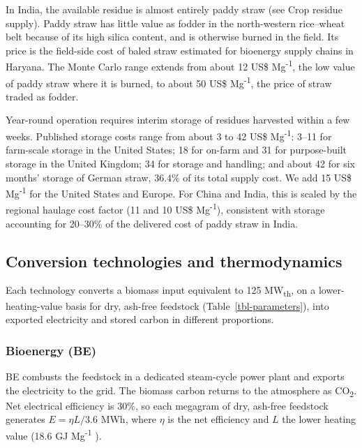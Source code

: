 \documentclass[
  letterpaper,
  twoside,
  twocolumn,
  9pt]{article}
\begin{document}
In India, the available residue is almost entirely paddy straw (see Crop
residue supply). Paddy straw has little value as fodder in the
north-western rice--wheat belt because of its high silica content, and
is otherwise burned in the field. Its price is the field-side cost of
baled straw estimated for bioenergy supply chains in
Haryana.\citep{sokhansanj2023} The Monte Carlo range extends from about
12 US\$ Mg\textsuperscript{-1}, the low value of paddy straw where it is
burned,\citep{erenstein2011} to about 50 US\$ Mg\textsuperscript{-1},
the price of straw traded as fodder.\citep{duncan2020, lopes2023}

Year-round operation requires interim storage of residues harvested
within a few weeks. Published storage costs range from about 3 to 42
US\$ Mg\textsuperscript{-1}: 3--11 for farm-scale storage in the United
States;\citep{becerra2022, brechbill2008, beach2012} 18 for on-farm and
31 for purpose-built storage in the United Kingdom;\citep{shackley2011}
34 for storage and handling;\citep{kung2013} and about 42 for six
months' storage of German straw, 36.4\% of its total supply
cost.\citep{karras2024} We add 15 US\$ Mg\textsuperscript{-1} for the
United States and Europe. For China and India, this is scaled by the
regional haulage cost factor (11 and 10 US\$ Mg\textsuperscript{-1}),
consistent with storage accounting for 20--30\% of the delivered cost of
paddy straw in India.\citep{ceew2021exsitu}

\subsection{Conversion technologies and
thermodynamics}\label{conversion-technologies-and-thermodynamics}

Each technology converts a biomass input equivalent to 125
MW\textsubscript{th}, on a lower-heating-value basis for dry, ash-free
feedstock (Table~\ref{tbl-parameters}), into exported electricity and
stored carbon in different proportions.

\subsubsection{Bioenergy (BE)}\label{bioenergy-be}

BE combusts the feedstock in a dedicated steam-cycle power plant and
exports the electricity to the grid. The biomass carbon returns to the
atmosphere as CO\textsubscript{2}. Net electrical efficiency is
30\%,\citep{dea2026} so each megagram of dry, ash-free feedstock
generates \(E = \eta L / 3.6\) MWh, where \(\eta\) is the net efficiency
and \(L\) the lower heating value (18.6 GJ Mg\textsuperscript{-1}
\citep{phyllis2}).
\end{document}
